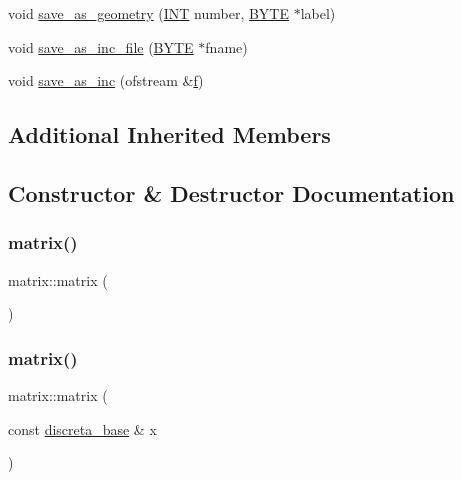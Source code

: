 \begin{DoxyCompactItemize}
\item 
void \mbox{\hyperlink{classmatrix_ae2ce1d7bc40998e94c67cc2336f47665}{save\+\_\+as\+\_\+geometry}} (\mbox{\hyperlink{galois_8h_a09fddde158a3a20bd2dcadb609de11dc}{I\+NT}} number, \mbox{\hyperlink{galois_8h_ab6cc7b4aeb6ea31aba2b3fbfc83ff5e6}{B\+Y\+TE}} $\ast$label)
\item 
void \mbox{\hyperlink{classmatrix_af3f3f862fff707b2fbc690aa65e36d9f}{save\+\_\+as\+\_\+inc\+\_\+file}} (\mbox{\hyperlink{galois_8h_ab6cc7b4aeb6ea31aba2b3fbfc83ff5e6}{B\+Y\+TE}} $\ast$fname)
\item 
void \mbox{\hyperlink{classmatrix_a2673ef8a4c7d322da7a5b6c61a20c65a}{save\+\_\+as\+\_\+inc}} (ofstream \&\mbox{\hyperlink{alphabet2_8_c_a362077c979b0bb65159c603270e40f70}{f}})
\end{DoxyCompactItemize}
\subsection*{Additional Inherited Members}


\subsection{Constructor \& Destructor Documentation}
\mbox{\label{classmatrix_a4daf70b1506ea976352f20e4322a9c17}} 
\subsubsection{\texorpdfstring{matrix()}{matrix()}\hspace{0.1cm}{\footnotesize\ttfamily [1/2]}}
{\footnotesize\ttfamily matrix\+::matrix (\begin{DoxyParamCaption}{ }\end{DoxyParamCaption})}

\mbox{\label{classmatrix_ac9e2b8134d8bd8d9789133c187d81d74}} 
\subsubsection{\texorpdfstring{matrix()}{matrix()}\hspace{0.1cm}{\footnotesize\ttfamily [2/2]}}
{\footnotesize\ttfamily matrix\+::matrix (\begin{DoxyParamCaption}\item[{const \mbox{\hyperlink{classdiscreta__base}{discreta\+\_\+base}} \&}]{x }\end{DoxyParamCaption})}

